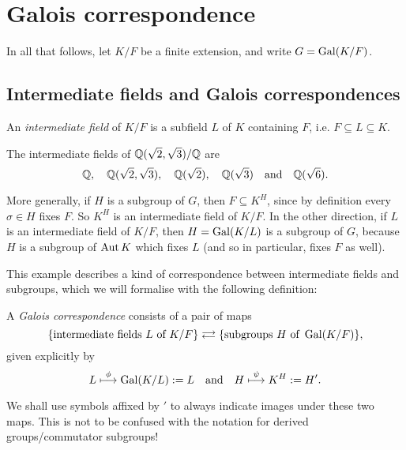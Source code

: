 \chapter{Galois correspondence}

In all that follows, let $K/F$ be a finite extension, and write $G = \operatorname{Gal}(K/F)$.

\section{Intermediate fields and Galois correspondences}

\begin{definition}
    An \emph{intermediate field} of $K/F$ is a subfield $L$ of $K$ containing $F$, i.e. $F \subseteq L \subseteq K$.
\end{definition}

\begin{example}
    The intermediate fields of $\mathbb{{Q}}(\sqrt{2}, \sqrt{3})/\mathbb{{Q}}$ are
    \[
        \mathbb{{Q}}, \quad \mathbb{{Q}}(\sqrt{2}, \sqrt{3}), \quad \mathbb{{Q}}(\sqrt{2}), \quad \mathbb{{Q}}(\sqrt{3}) \quad \text{and} \quad \mathbb{{Q}}(\sqrt{6}).
    \]
\end{example}

\begin{example}
    More generally, if $H$ is a subgroup of $G$, then $F \subseteq K^H$, since by definition every $\sigma \in H$ fixes $F$. So $K^H$ is an intermediate field of $K/F$. In the other direction, if $L$ is an intermediate field of $K/F$, then $H = \operatorname{Gal}(K/L)$ is a subgroup of $G$, because $H$ is a subgroup of $\operatorname{Aut}{K}$ which fixes $L$ (and so in particular, fixes $F$ as well).
\end{example}

This example describes a kind of correspondence between intermediate fields and subgroups, which we will formalise with the following definition:

\begin{definition}
    A \emph{Galois correspondence} consists of a pair of maps
    \[
        \{\text{intermediate fields } L \text{ of } K/F\}
        \correspondence
        \{\text{subgroups } H \text{ of } \gal(K/F)\},
    \]
    given explicitly by
    \[
        L \stackrel{\phi}{\longmapsto} \operatorname{Gal}(K/L) := L \quad \text{and} \quad H \stackrel{\psi}{\longmapsto} K^H := H'.
    \]
\end{definition}

\begin{remark}
    We shall use symbols affixed by $'$ to always indicate images under these two maps. This is not to be confused with the notation for derived groups/commutator subgroups!
\end{remark}

